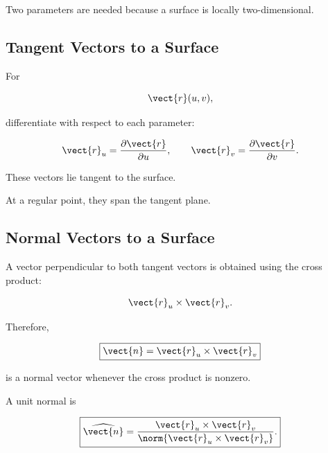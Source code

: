 Two parameters are needed because a surface is locally two-dimensional.

\subsection{Tangent Vectors to a Surface}
\label{subsec:surface-tangent-vectors}

For

\[ \vect{r}(u,v), \]

differentiate with respect to each parameter:

\[ \vect{r}_u=\frac{\partial\vect{r}}{\partial u},
\qquad
\vect{r}_v=\frac{\partial\vect{r}}{\partial v}. \]

These vectors lie tangent to the surface.

At a regular point, they span the tangent plane.

\begin{center}
\end{center}

\subsection{Normal Vectors to a Surface}
\label{subsec:surface-normal-vectors}

A vector perpendicular to both tangent vectors is obtained using the cross
product:

\[ \vect{r}_u\times\vect{r}_v. \]

Therefore,

\[ \boxed{\vect{n}=\vect{r}_u\times\vect{r}_v} \]

is a normal vector whenever the cross product is nonzero.

A unit normal is

\[ \boxed{
\widehat{\vect{n}}
=
\frac{\vect{r}_u\times\vect{r}_v}
{\norm{\vect{r}_u\times\vect{r}_v}}.
} \]

